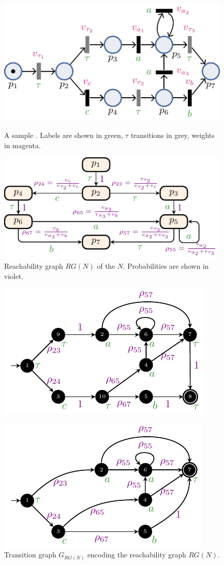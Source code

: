 \begin{figure}[!t]
	\begin{minipage}{.49\textwidth}
		\centering
		\includegraphics[width=.7\textwidth]{images/petri.pdf}
		\caption{A sample \uswn. Labels are shown in green, $\tau$ transitions in grey, weights in magenta.}\label{fig:spn}
	\end{minipage}\hfill \begin{minipage}{.49\textwidth}\centering
		\includegraphics[width=.8\textwidth]{images/rg.pdf}
		\caption{Reachability graph $RG(N)$ of the \uswn $N$. Probabilities are shown in violet.}\label{fig:rg}
	\end{minipage}
\end{figure} \begin{figure}[!t]
	\begin{minipage}{.49\textwidth}\centering \includegraphics[width=.55\textwidth]{images/running_example.pdf}
	\caption{Transition graph $G_{RG(N)}$ encoding the reachability graph $RG(N)$.}\label{fig:lmc}\label{fig:orig}
\end{minipage}\hfill \begin{minipage}{.49\textwidth}\centering \includegraphics[width=.55\textwidth]{images/closed_example.pdf}

\end{minipage}
\end{figure}
